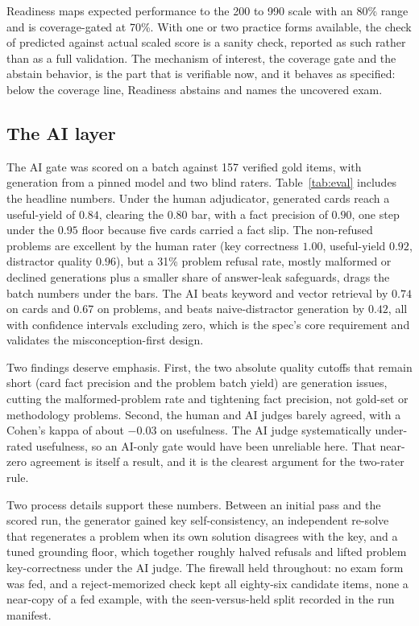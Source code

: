 \documentclass[11pt]{article}
\begin{document}
Readiness maps expected performance to the 200 to 990 scale with an 80\% range and is
coverage-gated at 70\%. With one or two practice forms available, the check of
predicted against actual scaled score is a sanity check, reported as such rather than
as a full validation. The mechanism of interest, the coverage gate and the abstain
behavior, is the part that is verifiable now, and it behaves as specified: below the
coverage line, Readiness abstains and names the uncovered exam.

\subsection{The AI layer}

The AI gate was scored on a batch against 157 verified gold items, with generation
from a pinned model and two blind raters. Table~\ref{tab:eval} includes the headline
numbers. Under the human adjudicator, generated cards reach a useful-yield of $0.84$,
clearing the $0.80$ bar, with a fact precision of $0.90$, one step under the $0.95$
floor because five cards carried a fact slip. The non-refused problems are excellent
by the human rater (key correctness $1.00$, useful-yield $0.92$, distractor quality
$0.96$), but a 31\% problem refusal rate, mostly malformed or declined generations
plus a smaller share of answer-leak safeguards, drags the batch numbers under the
bars. The AI beats keyword and vector retrieval by $0.74$ on cards and $0.67$ on
problems, and beats naive-distractor generation by $0.42$, all with confidence
intervals excluding zero, which is the spec's core requirement and validates the
misconception-first design.

Two findings deserve emphasis. First, the two absolute quality cutoffs that remain
short (card fact precision and the problem batch yield) are generation issues, cutting
the malformed-problem rate and tightening fact precision, not gold-set or methodology
problems. Second, the human and AI judges barely agreed, with a Cohen's kappa of
about $-0.03$ on usefulness. The AI judge systematically under-rated usefulness, so an
AI-only gate would have been unreliable here. That near-zero agreement is itself a
result, and it is the clearest argument for the two-rater rule.

Two process details support these numbers. Between an initial pass and the scored run,
the generator gained key self-consistency, an independent re-solve that regenerates a
problem when its own solution disagrees with the key, and a tuned grounding floor, which
together roughly halved refusals and lifted problem key-correctness under the AI judge.
The firewall held throughout: no exam form was fed, and a reject-memorized check kept
all eighty-six candidate items, none a near-copy of a fed example, with the
seen-versus-held split recorded in the run manifest.
\end{document}
